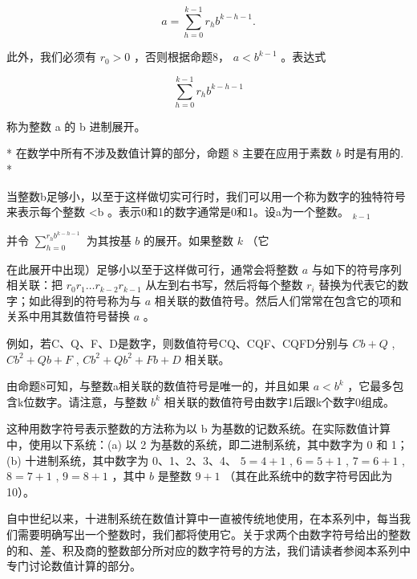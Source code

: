 \[
a = \sum_ {h = 0} ^ {k - 1} r _ {h} b ^ {k - h - 1}.
\]

此外，我们必须有 \(r_{0} > 0\) ，否则根据命题8， \(a < b^{k-1}\) 。表达式

\[
\sum_ {h = 0} ^ {k - 1} r _ {h} b ^ {k - h - 1}
\]

称为整数 a 的 b 进制展开。

* 在数学中所有不涉及数值计算的部分，命题 8 主要在应用于素数 \(b\) 时是有用的. *

当整数b足够小，以至于这样做切实可行时，我们可以用一个称为数字的独特符号来表示每个整数 \textless b 。表示0和1的数字通常是0和1。设a为一个整数。 \(_{k-1}\)

并令 \(\sum_{h=0}^{r_h b^{k-h-1}}\) 为其按基 \(b\) 的展开。如果整数 \(k\) （它

在此展开中出现）足够小以至于这样做可行，通常会将整数 \(a\) 与如下的符号序列相关联：把 \(r_0r_1 \ldots r_{k-2}r_{k-1}\) 从左到右书写，然后将每个整数 \(r_i\) 替换为代表它的数字；如此得到的符号称为与 \(a\) 相关联的数值符号。然后人们常常在包含它的项和关系中用其数值符号替换 \(a\) 。

例如，若C、Q、F、D是数字，则数值符号CQ、CQF、CQFD分别与 \(Cb + Q\) , \(Cb^{2} + Qb + F\) , \(Cb^{2} + Qb^{2} + Fb + D\) 相关联。

由命题8可知，与整数a相关联的数值符号是唯一的，并且如果 \(a < b^{k}\) ，它最多包含k位数字。请注意，与整数 \(b^{k}\) 相关联的数值符号由数字1后跟k个数字0组成。

这种用数字符号表示整数的方法称为以 b 为基数的记数系统。在实际数值计算中，使用以下系统：(a) 以 2 为基数的系统，即二进制系统，其中数字为 0 和 1；(b) 十进制系统，其中数字为 0、1、2、3、4、 \(5 = 4 + 1\) , \(6 = 5 + 1\) , \(7 = 6 + 1\) , \(8 = 7 + 1\) , \(9 = 8 + 1\) ，其中 \(b\) 是整数 \(9 + 1\) （其在此系统中的数字符号因此为 10）。

自中世纪以来，十进制系统在数值计算中一直被传统地使用，在本系列中，每当我们需要明确写出一个整数时，我们都将使用它。关于求两个由数字符号给出的整数的和、差、积及商的整数部分所对应的数字符号的方法，我们请读者参阅本系列中专门讨论数值计算的部分。

